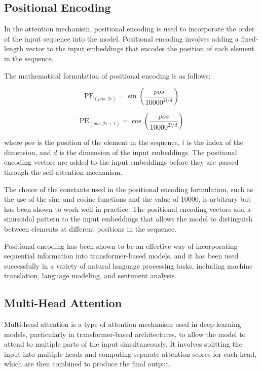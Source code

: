 \subsection{Positional Encoding}
\label{subsec:3_positional_encoding}

In the attention mechanism, positional encoding is used to incorporate the order of the input sequence into the model. Positional encoding involves adding a fixed-length vector to the input embeddings that encodes the position of each element in the sequence.

The mathematical formulation of positional encoding is as follows:

\begin{equation}
	\text{PE}_{(pos,2i)} = \sin\left(\frac{pos}{10000^{2i/d}}\right)
\end{equation}

\begin{equation}
	\text{PE}_{(pos,2i+1)} = \cos\left(\frac{pos}{10000^{2i/d}}\right)
\end{equation}

where $pos$ is the position of the element in the sequence, $i$ is the index of the dimension, and $d$ is the dimension of the input embeddings. The positional encoding vectors are added to the input embeddings before they are passed through the self-attention mechanism.

The choice of the constants used in the positional encoding formulation, such as the use of the sine and cosine functions and the value of $10000$, is arbitrary but has been shown to work well in practice. The positional encoding vectors add a sinusoidal pattern to the input embeddings that allows the model to distinguish between elements at different positions in the sequence.

Positional encoding has been shown to be an effective way of incorporating sequential information into transformer-based models, and it has been used successfully in a variety of natural language processing tasks, including machine translation, language modeling, and sentiment analysis.

\subsection{Multi-Head Attention}
\label{subsec:3_multi_head_attention}

Multi-head attention is a type of attention mechanism used in deep learning models, particularly in transformer-based architectures, to allow the model to attend to multiple parts of the input simultaneously. It involves splitting the input into multiple heads and computing separate attention scores for each head, which are then combined to produce the final output.

